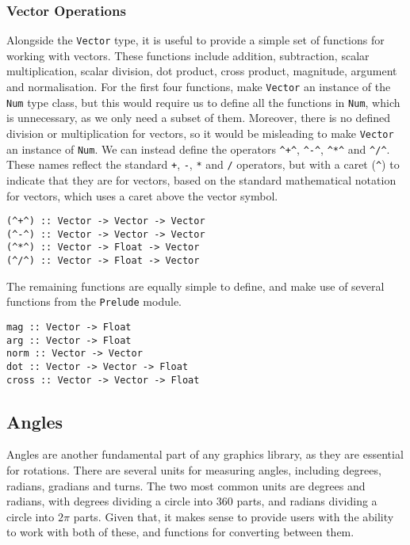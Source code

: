 \documentclass[../main.tex]{subfiles}
\begin{document}
            \subsubsection{Vector Operations}
                Alongside the \verb|Vector| type, it is useful to provide a simple set of
                    functions for working with vectors.
                These functions include addition, subtraction, scalar multiplication, scalar
                    division, dot product, cross product, magnitude, argument and normalisation.
                For the first four functions, make \verb|Vector| an instance of the \verb|Num|
                    type class, but this would require us to define all the functions in
                    \verb|Num|, which is unnecessary, as we only need a subset of them.
                Moreover, there is no defined division or multiplication for vectors, so it
                    would be misleading to make \verb|Vector| an instance of \verb|Num|.
                We can instead define the operators \verb|^+^|, \verb|^-^|, \verb|^*^| and
                    \verb|^/^|.
                These names reflect the standard \verb|+|, \verb|-|, \verb|*| and \verb|/|
                    operators, but with a caret (\verb|^|) to indicate that they are for vectors,
                    based on the standard mathematical notation for vectors, which uses a caret
                    above the vector symbol.

                \begin{lstlisting}[label={lst:vectorOps}, caption={The vector operators.}]
(^+^) :: Vector -> Vector -> Vector
(^-^) :: Vector -> Vector -> Vector
(^*^) :: Vector -> Float -> Vector
(^/^) :: Vector -> Float -> Vector\end{lstlisting}

                The remaining functions are equally simple to define, and make use of several
                    functions from the \verb|Prelude| module.

                \begin{lstlisting}[label={lst:vectorFns}, caption={The remaining vector functions.}]
mag :: Vector -> Float
arg :: Vector -> Float
norm :: Vector -> Vector
dot :: Vector -> Vector -> Float
cross :: Vector -> Vector -> Float\end{lstlisting}

        \subsection{Angles}
            Angles are another fundamental part of any graphics library, as they are
                essential for rotations.
            There are several units for measuring angles, including degrees, radians,
                gradians and turns.
            The two most common units are degrees and radians, with degrees dividing a
                circle into 360 parts, and radians dividing a circle into $2\pi$ parts.
            Given that, it makes sense to provide users with the ability to work with both
                of these, and functions for converting between them.
\end{document}

